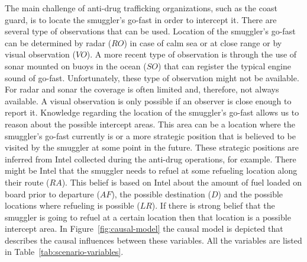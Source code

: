 \documentclass[conference]{IEEEtran}
\begin{document}
The main challenge of anti-drug trafficking organizations, such as the coast guard, is to locate the smuggler's go-fast in order to intercept it. There are several type of observations that can be used. Location of the smuggler's go-fast can be determined by radar ($RO$) in case of calm sea or at close range or by visual observation ($VO$). A more recent type of observation is through the use of sonar mounted on buoys in the ocean ($SO$) that can register the typical engine sound of go-fast. Unfortunately, these type of observation might not be available. For radar and sonar the coverage is often limited and, therefore, not always available. A visual observation is only possible if an observer is close enough to report it. Knowledge regarding the location of the smuggler's go-fast allows us to reason about the possible intercept areas. This area can be a location where the smuggler's go-fast currently is or a more strategic position that is believed to be visited by the smuggler at some point in the future. These strategic positions are inferred from Intel collected during the anti-drug operations, for example. There might be Intel that the smuggler needs to refuel at some refueling location along their route ($RA$). This belief is based on Intel about the amount of fuel loaded on board prior to departure ($AF$), the possible destination ($D$) and the possible locations where refueling is possible ($LR$). If there is strong belief that the smuggler is going to refuel at a certain location then that location is a possible intercept area. In Figure~\ref{fig:causal-model} the causal model is depicted that describes the causal influences between these variables. All the variables are listed in Table~\ref{tab:scenario-variables}.
\end{document}
